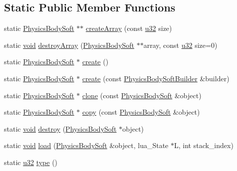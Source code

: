 \subsection*{Static Public Member Functions}
\begin{DoxyCompactItemize}
\item 
static \mbox{\hyperlink{classnjli_1_1_physics_body_soft}{Physics\+Body\+Soft}} $\ast$$\ast$ \mbox{\hyperlink{classnjli_1_1_physics_body_soft_ac66deabb8649d1292091ac38ffe7b754}{create\+Array}} (const \mbox{\hyperlink{_util_8h_a10e94b422ef0c20dcdec20d31a1f5049}{u32}} size)
\item 
static \mbox{\hyperlink{_thread_8h_af1e856da2e658414cb2456cb6f7ebc66}{void}} \mbox{\hyperlink{classnjli_1_1_physics_body_soft_a00f6b3d236273705d53e306ad7da80ed}{destroy\+Array}} (\mbox{\hyperlink{classnjli_1_1_physics_body_soft}{Physics\+Body\+Soft}} $\ast$$\ast$array, const \mbox{\hyperlink{_util_8h_a10e94b422ef0c20dcdec20d31a1f5049}{u32}} size=0)
\item 
static \mbox{\hyperlink{classnjli_1_1_physics_body_soft}{Physics\+Body\+Soft}} $\ast$ \mbox{\hyperlink{classnjli_1_1_physics_body_soft_a198d97f667d97209f031539d5f885cfb}{create}} ()
\item 
static \mbox{\hyperlink{classnjli_1_1_physics_body_soft}{Physics\+Body\+Soft}} $\ast$ \mbox{\hyperlink{classnjli_1_1_physics_body_soft_a31d96acaf729965ab5784ec230ccf6cf}{create}} (const \mbox{\hyperlink{classnjli_1_1_physics_body_soft_builder}{Physics\+Body\+Soft\+Builder}} \&builder)
\item 
static \mbox{\hyperlink{classnjli_1_1_physics_body_soft}{Physics\+Body\+Soft}} $\ast$ \mbox{\hyperlink{classnjli_1_1_physics_body_soft_a64e0e3a72cd3fc10fe0f877b1b4ba50e}{clone}} (const \mbox{\hyperlink{classnjli_1_1_physics_body_soft}{Physics\+Body\+Soft}} \&object)
\item 
static \mbox{\hyperlink{classnjli_1_1_physics_body_soft}{Physics\+Body\+Soft}} $\ast$ \mbox{\hyperlink{classnjli_1_1_physics_body_soft_a18f365a1ab8ddc523c38dddda20049dd}{copy}} (const \mbox{\hyperlink{classnjli_1_1_physics_body_soft}{Physics\+Body\+Soft}} \&object)
\item 
static \mbox{\hyperlink{_thread_8h_af1e856da2e658414cb2456cb6f7ebc66}{void}} \mbox{\hyperlink{classnjli_1_1_physics_body_soft_a5a41905cf8b3016cf9adfd19a1b0f827}{destroy}} (\mbox{\hyperlink{classnjli_1_1_physics_body_soft}{Physics\+Body\+Soft}} $\ast$object)
\item 
static \mbox{\hyperlink{_thread_8h_af1e856da2e658414cb2456cb6f7ebc66}{void}} \mbox{\hyperlink{classnjli_1_1_physics_body_soft_aa91c3dff512d08491eb7b964b1164d53}{load}} (\mbox{\hyperlink{classnjli_1_1_physics_body_soft}{Physics\+Body\+Soft}} \&object, lua\+\_\+\+State $\ast$L, int stack\+\_\+index)
\item 
static \mbox{\hyperlink{_util_8h_a10e94b422ef0c20dcdec20d31a1f5049}{u32}} \mbox{\hyperlink{classnjli_1_1_physics_body_soft_ae2affac4ff13b2d8b43114d9a0c14058}{type}} ()
\end{DoxyCompactItemize}
